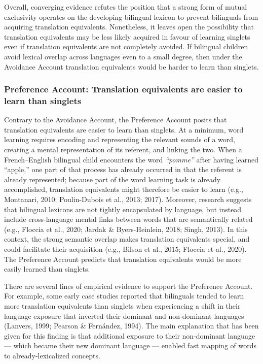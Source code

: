 \documentclass[
  english,
  ,man,floatsintext]{apa6}
\begin{document}
Overall, converging evidence refutes the position that a strong form of mutual exclusivity operates on the developing bilingual lexicon to prevent bilinguals from acquiring translation equivalents. Nonetheless, it leaves open the possibility that translation equivalents may be less likely acquired in favour of learning singlets even if translation equivalents are not completely avoided. If bilingual children avoid lexical overlap across languages even to a small degree, then under the Avoidance Account translation equivalents would be harder to learn than singlets.

\hypertarget{preference-account-translation-equivalents-are-easier-to-learn-than-singlets}{%
\subsubsection{Preference Account: Translation equivalents are easier to learn than singlets}\label{preference-account-translation-equivalents-are-easier-to-learn-than-singlets}}

Contrary to the Avoidance Account, the Preference Account posits that translation equivalents are easier to learn than singlets. At a minimum, word learning requires encoding and representing the relevant sounds of a word, creating a mental representation of its referent, and linking the two. When a French--English bilingual child encounters the word \emph{``pomme''} after having learned ``apple,'' one part of that process has already occurred in that the referent is already represented; because part of the word learning task is already accomplished, translation equivalents might therefore be easier to learn (e.g., Montanari, 2010; Poulin-Dubois et al., 2013; 2017). Moreover, research suggests that bilingual lexicons are not tightly encapsulated by language, but instead include cross-language mental links between words that are semantically related (e.g., Floccia et al., 2020; Jardak \& Byers-Heinlein, 2018; Singh, 2013). In this context, the strong semantic overlap makes translation equivalents special, and could facilitate their acquisition (e.g., Bilson et al., 2015; Floccia et al., 2020). The Preference Account predicts that translation equivalents would be more easily learned than singlets.

There are several lines of empirical evidence to support the Preference Account. For example, some early case studies reported that bilinguals tended to learn more translation equivalents than singlets when experiencing a shift in their language exposure that inverted their dominant and non-dominant languages (Lanvers, 1999; Pearson \& Fernández, 1994). The main explanation that has been given for this finding is that additional exposure to their non-dominant language --- which became their new dominant language --- enabled fast mapping of words to already-lexicalized concepts.
\end{document}
